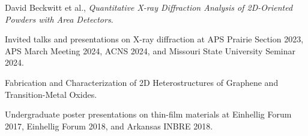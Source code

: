 

{\small
\begin{description}[font=\normalfont\bfseries,leftmargin=2.8cm,labelsep=0.8em,itemsep=0.2em,topsep=0.1em,parsep=0pt,partopsep=0pt]
  \item[Planned 2026] David Beckwitt et al., \textit{Quantitative X-ray Diffraction Analysis of 2D-Oriented Powders with Area Detectors}.
\end{description}
}


{\small
\begin{description}[font=\normalfont\bfseries,leftmargin=2.8cm,labelsep=0.8em,itemsep=0.2em,topsep=0.1em,parsep=0pt,partopsep=0pt]
  \item[2023--2024] Invited talks and presentations on X-ray diffraction at APS Prairie Section 2023, APS March Meeting 2024, ACNS 2024, and Missouri State University Seminar 2024.
  \item[2020] Fabrication and Characterization of 2D Heterostructures of Graphene and Transition-Metal Oxides.
  \item[2017--2018] Undergraduate poster presentations on thin-film materials at Einhellig Forum 2017, Einhellig Forum 2018, and Arkansas INBRE 2018.
\end{description}
}
